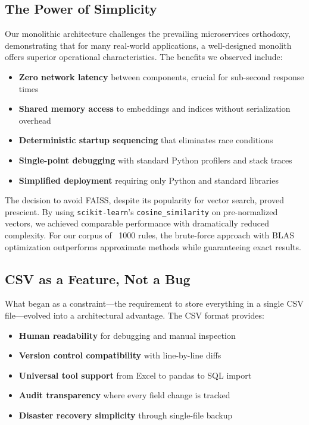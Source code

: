 \subsection{The Power of Simplicity}

Our monolithic architecture challenges the prevailing microservices orthodoxy, demonstrating that for many real-world applications, a well-designed monolith offers superior operational characteristics. The benefits we observed include:

\begin{itemize}[leftmargin=*,itemsep=2pt,topsep=2pt]
 \item \textbf{Zero network latency} between components, crucial for sub-second response times
 \item \textbf{Shared memory access} to embeddings and indices without serialization overhead
 \item \textbf{Deterministic startup sequencing} that eliminates race conditions
 \item \textbf{Single-point debugging} with standard Python profilers and stack traces
 \item \textbf{Simplified deployment} requiring only Python and standard libraries
\end{itemize}

The decision to avoid FAISS, despite its popularity for vector search, proved prescient. By using \texttt{scikit-learn}'s \texttt{cosine\_similarity} on pre-normalized vectors, we achieved comparable performance with dramatically reduced complexity. For our corpus of ~1000 rules, the brute-force approach with BLAS optimization outperforms approximate methods while guaranteeing exact results.

\subsection{CSV as a Feature, Not a Bug}

What began as a constraint—the requirement to store everything in a single CSV file—evolved into a architectural advantage. The CSV format provides:

\begin{itemize}[leftmargin=*,itemsep=2pt,topsep=2pt]
 \item \textbf{Human readability} for debugging and manual inspection
 \item \textbf{Version control compatibility} with line-by-line diffs
 \item \textbf{Universal tool support} from Excel to pandas to SQL import
 \item \textbf{Audit transparency} where every field change is tracked
 \item \textbf{Disaster recovery simplicity} through single-file backup
\end{itemize}

